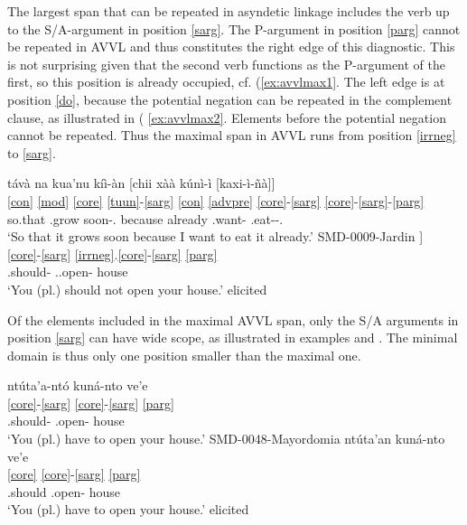 \documentclass[output=paper]{langscibook}
\begin{document}
The largest span that can be repeated in asyndetic linkage includes the verb up to the S/A-argument in position \ref{sarg}. The P-argument in position \ref{parg} cannot be repeated in AVVL and thus constitutes the right edge of this diagnostic.
This is not surprising given that the second verb functions as the P-argument of the first, so this position is already occupied, cf. (\ref{ex:avvlmax1}.
The left edge is at position \ref{do}, because the potential negation can be repeated in the complement clause, as illustrated in ( \ref{ex:avvlmax2}. Elements before the potential negation cannot be repeated. 
Thus the maximal span in AVVL runs from position \ref{irrneg} to \ref{sarg}.

\ea \label{ex:avvlmax1}
    \ea
     \glll  távà na kua'nu kíì-àn [chii xàà kúnì-ì [kaxi-ì-ñà]] \\
     \ref{con} \ref{mod} \ref{core} \ref{tuun}-\ref{sarg} \ref{con} \ref{advpre} \ref{core}-\ref{sarg} \ref{core}-\ref{sarg}-\ref{parg} \\
     so.that \Mod{} \Pot.grow soon-\Third.\Thing{} because already \Incmpl.want-\Fsg{} \Pot.eat-\Fsg-\Third.\Thing{} \\
     \glt `So that it grows soon because I want to eat it already.' \hfill SMD-0009-Jardin
    \ex \label{ex:avvlmax2}
     \glll [ntúta'a-ntó [ukuná-nto ve'e]]	\\
     \ref{core}-\ref{sarg} \ref{irrneg}.\ref{core}-\ref{sarg} \ref{parg} \\
     \Incmpl.should-\Spl{} \Neg.\Pot.open-\Spl{} house \\
     \glt `You (pl.) should not open your house.' \hfill elicited
    \z
\z

Of the elements included in the maximal AVVL span, only the S/A arguments in position \ref{sarg} can have wide scope, as illustrated in examples  and .
The minimal domain is thus only one position smaller than the maximal one.

\ea
    \ea \label{ex:avvlmin1}
     \glll ntúta'a-ntó kuná-nto ve'e	\\
     \ref{core}-\ref{sarg} \ref{core}-\ref{sarg} \ref{parg} \\
     \Incmpl.should-\Spl{} \Pot.open-\Spl{} house \\
     \glt `You (pl.) have to open your house.' \hfill SMD-0048-Mayordomia
    \ex \label{ex:avvlmin2}
     \glll ntúta'an kuná-nto ve'e	\\
     \ref{core} \ref{core}-\ref{sarg} \ref{parg} \\
     \Incmpl.should \Pot.open-\Ssg{} house \\
     \glt `You (pl.) have to open your house.' \hfill elicited
    \z
\z
\end{document}
